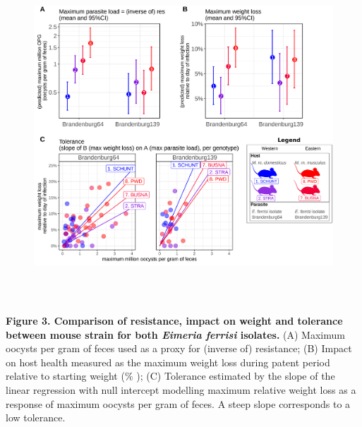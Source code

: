 \documentclass[12pt]{article}
\renewcommand{\_}{\kern-1.5pt\textunderscore\kern-1.5pt}
\begin{document}

\newpage
\par




\begin{figure}[H]
	\begin{Center}
		\includegraphics[width=5.63in,height=4.88in]{./media/image5.png}
	\end{Center}
\end{figure}



\par

{\fontsize{10pt}{12.0pt}\selectfont \textbf{Figure 3. Comparison of resistance, impact on weight and tolerance between mouse strain for both \textit{Eimeria ferrisi }isolates. }(A) Maximum oocysts per gram of feces used as a proxy for (inverse of) resistance; (B) Impact on host health measured as the maximum weight loss during patent period relative to starting weight ($\%$ ); (C) Tolerance estimated by the slope of the linear regression with null intercept modelling maximum relative weight loss as a response of maximum oocysts per gram of feces. A steep slope corresponds to a low tolerance.\par}\par
\end{document}

